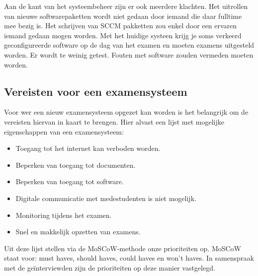Aan de kant van het systeembeheer zijn er ook meerdere klachten. Het uitrollen van nieuwe softwarepaketten wordt niet gedaan door iemand die daar fulltime mee bezig is. Het schrijven van SCCM pakketten zou enkel door een ervaren iemand gedaan mogen worden.  Met het huidige systeen krijg je soms verkeerd geconfigureerde software op de dag van het examen en moeten examens uitgesteld worden. Er wordt te weinig getest. Fouten met software zouden vermeden moeten worden. 

\subsection{Vereisten voor een examensysteem}

Voor wer een nieuw examensysteem opgezet kan worden is het belangrijk om de vereisten hiervan in kaart te brengen. Hier alvast een lijst met mogelijke eigenschappen van een examensysteem: 
	\begin{itemize}
	\item Toegang tot het internet kan verboden worden.
	\item Beperken van toegang tot documenten.
	\item Beperken van toegang tot software.
	\item Digitale communicatie met medestudenten is niet mogelijk.
	\item Monitoring tijdens het examen.
	\item Snel en makkelijk opzetten van examens. 
	
\end{itemize}	

Uit deze lijst stellen via de MoSCoW-methode onze prioriteiten op. MoSCoW staat voor: must haves, should haves, could haves en won't haves. In samenspraak met de ge\"{i}nterviewden zijn de prioriteiten op deze manier vastgelegd. 

